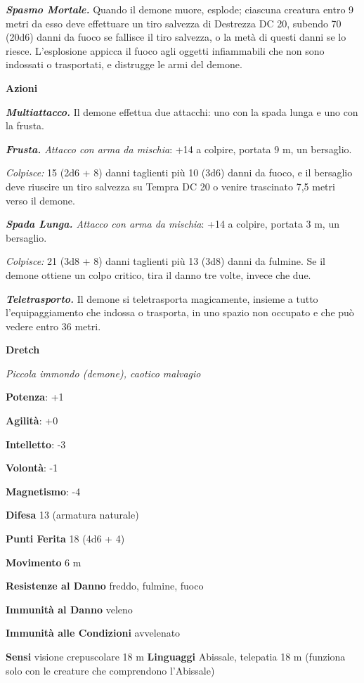 \begin{multicols}{2}
\emph{\textbf{Spasmo Mortale.}} Quando il demone muore, esplode;
ciascuna creatura entro 9 metri da esso deve effettuare un tiro salvezza
di Destrezza DC 20, subendo 70 (20d6) danni da fuoco se fallisce il tiro
salvezza, o la metà di questi danni se lo riesce. L'esplosione appicca
il fuoco agli oggetti infiammabili che non sono indossati o trasportati,
e distrugge le armi del demone.

\textbf{Azioni}

\emph{\textbf{Multiattacco.}} Il demone effettua due attacchi: uno con
la spada lunga e uno con la frusta.

\emph{\textbf{Frusta.} Attacco con arma da mischia}: +14 a colpire,
portata 9 m, un bersaglio.

\emph{Colpisce:} 15 (2d6 + 8) danni taglienti più 10 (3d6) danni da
fuoco, e il bersaglio deve riuscire un tiro salvezza su Tempra DC 20 o
venire trascinato 7,5 metri verso il demone.

\emph{\textbf{Spada Lunga.} Attacco con arma da mischia}: +14 a colpire,
portata 3 m, un bersaglio.

\emph{Colpisce:} 21 (3d8 + 8) danni taglienti più 13 (3d8) danni da
fulmine. Se il demone ottiene un colpo critico, tira il danno tre volte,
invece che due.

\emph{\textbf{Teletrasporto.}} Il demone si teletrasporta magicamente,
insieme a tutto l'equipaggiamento che indossa o trasporta, in uno spazio
non occupato e che può vedere entro 36 metri.

\textbf{Dretch}

\emph{Piccola immondo (demone), caotico malvagio}

\textbf{Potenza}: +1

\textbf{Agilità}: +0

\textbf{Intelletto}: -3

\textbf{Volontà}: -1

\textbf{Magnetismo}: -4

\textbf{Difesa} 13 (armatura naturale)

\textbf{Punti Ferita} 18 (4d6 + 4)

\textbf{Movimento} 6 m

\textbf{Resistenze al Danno} freddo, fulmine, fuoco

\textbf{Immunità al Danno} veleno

\textbf{Immunità alle Condizioni} avvelenato

\textbf{Sensi} visione crepuscolare 18 m
\textbf{Linguaggi} Abissale, telepatia 18 m (funziona solo con le
creature che comprendono l'Abissale)


\end{multicols}

